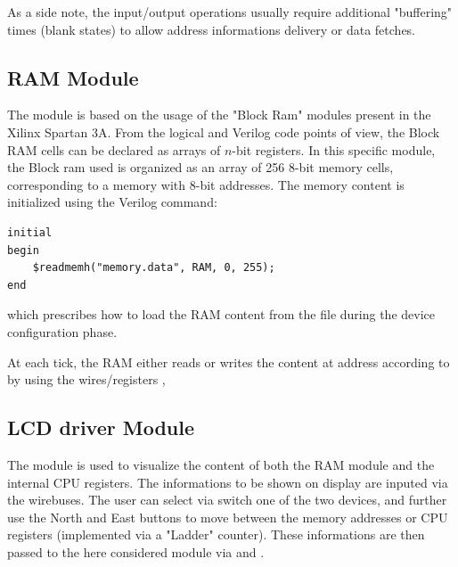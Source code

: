 As a side note, the input/output operations usually require additional "buffering" times (blank states) to allow address informations delivery or data fetches.

\subsection{RAM Module}  \label{ssec:ram}
The  module is based on the usage of the "Block Ram" modules present in the Xilinx Spartan 3A.
From the logical and Verilog code points of view, the Block RAM cells can be declared as arrays of $n$-bit registers.
In this specific module, the Block ram used is organized as an array of 256 8-bit memory cells, corresponding to a memory with 8-bit addresses.
The memory content is initialized using the Verilog command:
\begin{verbatim}
initial
begin
	$readmemh("memory.data", RAM, 0, 255);
end
\end{verbatim}
which prescribes how to load the RAM content from the file  during the device configuration phase.

At each  tick, the RAM either reads or writes the content at address  according to 
by using the wires/registers , 


\subsection{LCD driver Module}  \label{ssec:lcd}
The  module is used to visualize the content of both the RAM module and the internal CPU registers.
The informations to be shown on display are inputed via the  wirebuses.
The user can select via switch one of the two devices, and further use the North and East buttons to move between the memory addresses
or CPU registers (implemented via a "Ladder" counter).
These informations are then passed to the here considered module via  and .

